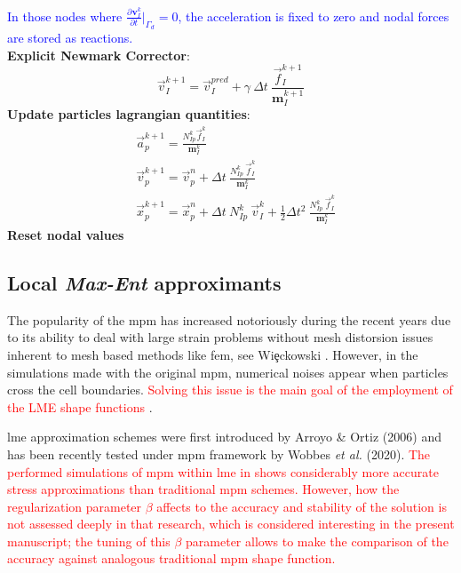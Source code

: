 \documentclass[preprint,12pt,a4paper]{elsarticle}
\newcommand{\vect}[1]{
  \ensuremath{\mathbf{{#1}}}
}
\newcommand{\tens}[1]{
  \ensuremath{\mathbf{{#1}}}
}
\newcommand{\Deriv}[3][]{
  \ensuremath{\frac{\partial^{#1}{#2}}{ \partial {#3}^{#1} }}
}
\newcommand{\PNA}[1]{
  \textcolor{red}{{#1}}
}
\newcommand{\MMP}[1]{
  \textcolor{blue}{{#1}}
}
\begin{document}
\begin{algorithm}
\begin{algorithmic}[1]
    \MMP{In those nodes where $\Deriv{\vect{v}_I^{k}}{t} \big\rvert_{\Gamma_d} = 0$,
      the acceleration is fixed to zero and nodal forces are stored as
      reactions.}\\
    \STATE \textbf{Explicit Newmark Corrector}:
    \begin{equation*}
      \vec{v}_{I}^{k+1} = \vec{v}_{I}^{pred} + \gamma\ \Delta t\ \frac{\vec{f}_{I}^{k+1}}{\tens{m}_I^{k+1}}  
    \end{equation*}
    \STATE \textbf{Update particles lagrangian quantities}:
    \begin{align*}
      &\vec{a}_p^{k+1} = \frac{N_{Ip}^k\vec{f}_{I}^{k}}{\tens{m}_I^k}\\
      &\vec{v}_p^{k+1} = \vec{v}_p^n + \Delta t\
        \frac{N_{Ip}^k\
        \vec{f}_{I}^{k}}{\tens{m}_I^k}\\
      &\vec{x}_p^{k+1} = \vec{x}_p^n + \Delta t\
         N_{Ip}^k\ \vec{v}_{I}^{k} +
        \frac{1}{2}\Delta t^2\ \frac{N_{Ip}^k\
        \vec{f}_{I}^{k}}{\tens{m}_I^k}
    \end{align*}
    \STATE \textbf{Reset nodal values}
  \end{algorithmic}
\end{algorithm}

\subsection{Local \textit{Max-Ent} approximants}
\label{sec:local-max-ent}
The popularity of the \acrshort{mpm} has increased notoriously during
the recent years due to its ability to deal with large strain problems
without mesh distorsion issues inherent to mesh based methods like
\acrshort{fem}, see Wi{\c{e}}ckowski \cite{Wieckowski2004}. However, in the simulations
made with the original \acrshort{mpm}, numerical noises appear when particles
cross the cell boundaries. \PNA{Solving this issue is the main goal of the employment of the \acrshort{LME} shape functions}.

\acrfull{lme} approximation schemes were
first introduced by Arroyo \& Ortiz (2006)\cite{Arroyo2006} and has been
recently tested under \acrshort{mpm} framework by Wobbes {\it et al.}
(2020)\cite{Wobbes2020}. \PNA{The performed simulations of \acrshort{mpm}
within \acrshort{lme} in \cite{Wobbes2020} shows considerably more accurate stress
approximations than traditional \acrshort{mpm} schemes. However, 
how the regularization parameter $\beta$
affects to the accuracy and stability of the solution is not assessed deeply in that research, which is considered interesting in the present manuscript; the tuning of this $\beta$ parameter allows to make the comparison of the accuracy against analogous traditional \acrshort{mpm} shape function.} 
\end{document}
